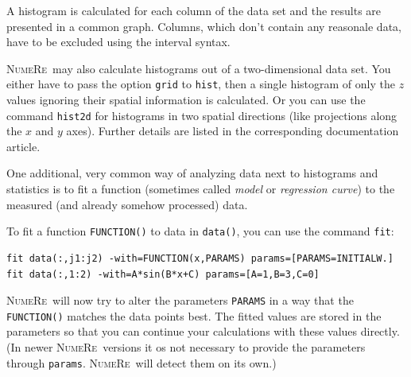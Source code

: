 \documentclass[DIV=14,headsepline,footsepline]{scrbook}
\newcommand{\NR}{\textsc{Nu\-me\-Re}}
\begin{document}
				A histogram is calculated for each column of the data set and the results are presented in a common graph. Columns, which don't contain any reasonale data, have to be excluded using the interval syntax.
				
				\NR\ may also calculate histograms out of a two-dimensional data set. You either have to pass the option \lstinline+grid+ to \lstinline+hist+, then a single histogram of only the $z$ values ignoring their spatial information is calculated. Or you can use the command \lstinline+hist2d+ for histograms in two spatial directions (like projections along the $x$ and $y$ axes). Further details are listed in the corresponding documentation article.
				
				One additional, very common way of analyzing data next to histograms and statistics is to fit a function (sometimes called \emph{model} or \emph{regression curve}) to the measured (and already somehow processed) data.
				
				To fit a function \lstinline+FUNCTION()+ to data in \lstinline+data()+, you can use the command \lstinline+fit+:
				\begin{lstlisting}
fit data(:,j1:j2) -with=FUNCTION(x,PARAMS) params=[PARAMS=INITIALW.]
fit data(:,1:2) -with=A*sin(B*x+C) params=[A=1,B=3,C=0]
				\end{lstlisting}
				\NR\ will now try to alter the parameters \lstinline+PARAMS+ in a way that the \lstinline+FUNCTION()+ matches the data points best. The fitted values are stored in the parameters so that you can continue your calculations with these values directly. (In newer \NR\ versions it os not necessary to provide the parameters through \lstinline+params+. \NR\ will detect them on its own.)
				
\end{document}
